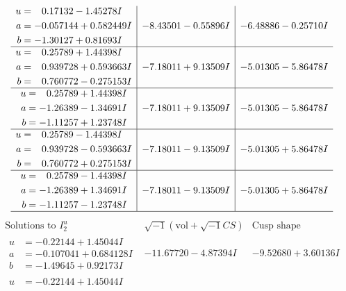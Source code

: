 \documentclass[1p]{elsarticle_modified}
\theoremstyle{definition}
\newcommand{\I}{\sqrt{-1}}
\begin{document}
$$\begin{array}{c|c|c}
\begin{aligned}
u &= \phantom{-}0.17132 - 1.45278 I \\
a &= -0.057144 + 0.582449 I \\
b &= -1.30127 + 0.81693 I\end{aligned}
 & -8.43501 - 0.55896 I & -6.48886 - 0.25710 I \\ \hline\begin{aligned}
u &= \phantom{-}0.25789 + 1.44398 I \\
a &= \phantom{-}0.939728 + 0.593663 I \\
b &= \phantom{-}0.760772 - 0.275153 I\end{aligned}
 & -7.18011 + 9.13509 I & -5.01305 - 5.86478 I \\ \hline\begin{aligned}
u &= \phantom{-}0.25789 + 1.44398 I \\
a &= -1.26389 - 1.34691 I \\
b &= -1.11257 + 1.23748 I\end{aligned}
 & -7.18011 + 9.13509 I & -5.01305 - 5.86478 I \\ \hline\begin{aligned}
u &= \phantom{-}0.25789 - 1.44398 I \\
a &= \phantom{-}0.939728 - 0.593663 I \\
b &= \phantom{-}0.760772 + 0.275153 I\end{aligned}
 & -7.18011 - 9.13509 I & -5.01305 + 5.86478 I \\ \hline\begin{aligned}
u &= \phantom{-}0.25789 - 1.44398 I \\
a &= -1.26389 + 1.34691 I \\
b &= -1.11257 - 1.23748 I\end{aligned}
 & -7.18011 - 9.13509 I & -5.01305 + 5.86478 I\\
 \hline 
 \end{array}$$\newpage$$\begin{array}{c|c|c}  
\text{Solutions to }I^u_{2}& \I (\text{vol} + \sqrt{-1}CS) & \text{Cusp shape}\\
 \hline 
\begin{aligned}
u &= -0.22144 + 1.45044 I \\
a &= -0.107041 + 0.684128 I \\
b &= -1.49645 + 0.92173 I\end{aligned}
 & -11.67720 - 4.87394 I & -9.52680 + 3.60136 I \\ \hline\begin{aligned}
u &= -0.22144 + 1.45044 I \\

\end{aligned}
\end{array}$$
\end{document}
